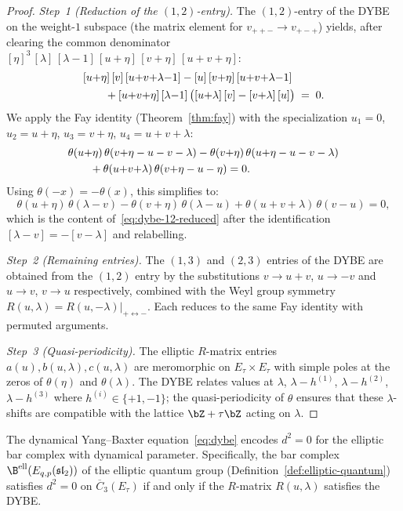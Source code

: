 \begin{proof}
\emph{Step~1 (Reduction of the $(1,2)$-entry).}
The $(1,2)$-entry of the DYBE on the weight-$1$ subspace
(the matrix element for $v_{++-} \to v_{+-+}$) yields,
after clearing the common denominator
$[\eta]^3\,[\lambda]\,[\lambda{-}1]\,[u{+}\eta]\,[v{+}\eta]\,
[u{+}v{+}\eta]$:
\begin{align}\label{eq:dybe-12-reduced}
&[u{+}\eta]\,[v]\,[u{+}v{+}\lambda{-}1]
- [u]\,[v{+}\eta]\,[u{+}v{+}\lambda{-}1] \notag \\
&\qquad + [u{+}v{+}\eta]\,[\lambda{-}1]\,
\bigl([u{+}\lambda]\,[v] - [v{+}\lambda]\,[u]\bigr)
\;=\; 0.
\end{align}
We apply the Fay identity (Theorem~\ref{thm:fay})
with the specialization $u_1 = 0$, $u_2 = u + \eta$,
$u_3 = v + \eta$, $u_4 = u + v + \lambda$:
\begin{align}
&\theta(u{+}\eta)\,\theta(v{+}\eta - u - v - \lambda)
- \theta(v{+}\eta)\,\theta(u{+}\eta - u - v - \lambda) \notag \\
&\qquad + \theta(u{+}v{+}\lambda)\,\theta(v{+}\eta - u - \eta)
= 0.
\end{align}
Using $\theta(-x) = -\theta(x)$, this simplifies to:
\[
\theta(u{+}\eta)\,\theta(\lambda{-}v)
- \theta(v{+}\eta)\,\theta(\lambda{-}u)
+ \theta(u{+}v{+}\lambda)\,\theta(v{-}u) = 0,
\]
which is the content of~\eqref{eq:dybe-12-reduced}
after the identification $[\lambda{-}v] = -[v{-}\lambda]$
and relabelling.

\emph{Step~2 (Remaining entries).}
The $(1,3)$ and $(2,3)$ entries of the DYBE are obtained
from the $(1,2)$ entry by the substitutions
$v \to u+v$, $u \to -v$ and $u \to v$, $v \to u$ respectively,
combined with the Weyl group symmetry
$R(u,\lambda) = R(u,-\lambda)|_{+\leftrightarrow -}$.
Each reduces to the same Fay identity with permuted arguments.

\emph{Step~3 (Quasi-periodicity).}
The elliptic $R$-matrix entries $a(u), b(u,\lambda), c(u,\lambda)$
are meromorphic on $E_\tau \times E_\tau$ with simple poles at the
zeros of $\theta(\eta)$ and $\theta(\lambda)$. The DYBE
relates values at $\lambda$, $\lambda - h^{(1)}$, $\lambda - h^{(2)}$,
$\lambda - h^{(3)}$ where $h^{(i)} \in \{+1, -1\}$; the
quasi-periodicity of $\theta$ ensures that these $\lambda$-shifts
are compatible with the lattice $\bZ + \tau\bZ$ acting on $\lambda$.
\end{proof}

\begin{proposition}
\label{prop:dybe-bar-nilpotency}
The dynamical Yang--Baxter equation~\eqref{eq:dybe} encodes
$d^2 = 0$ for the elliptic bar complex with dynamical parameter.
Specifically, the bar complex
$\B^{\mathrm{ell}}(E_{q,p}(\mathfrak{sl}_2))$
of the elliptic quantum group
\textup{(}Definition~\textup{\ref{def:elliptic-quantum})}
satisfies $d^2 = 0$ on
$\overline{C}_3(E_\tau)$ if and only if the $R$-matrix
$R(u,\lambda)$ satisfies the DYBE.
\end{proposition}

